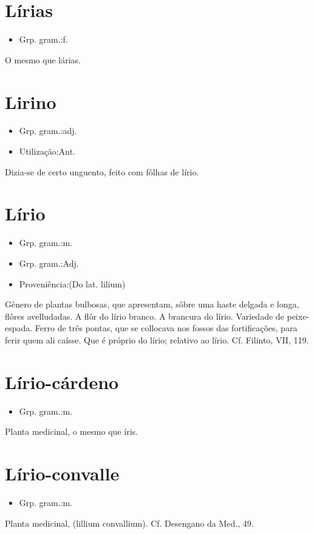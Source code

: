 \section{Lírias}
\begin{itemize}
\item {Grp. gram.:f.}
\end{itemize}
O mesmo que \textunderscore lárias\textunderscore .
\section{Lirino}
\begin{itemize}
\item {Grp. gram.:adj.}
\end{itemize}
\begin{itemize}
\item {Utilização:Ant.}
\end{itemize}
Dizia-se de certo unguento, feito com fôlhas de lírio.
\section{Lírio}
\begin{itemize}
\item {Grp. gram.:m.}
\end{itemize}
\begin{itemize}
\item {Grp. gram.:Adj.}
\end{itemize}
\begin{itemize}
\item {Proveniência:(Do lat. \textunderscore lilium\textunderscore )}
\end{itemize}
Gênero de plantas bulbosas, que apresentam, sôbre uma haste delgada e longa, flôres avelludadas.
A flôr do lírio branco.
A brancura do lírio.
Variedade de peixe-espada.
Ferro de três pontas, que se collocava nos fossos das fortificações, para ferir quem ali caísse.
Que é próprio do lírio; relativo ao lírio. Cf. Filinto, VII, 119.
\section{Lírio-cárdeno}
\begin{itemize}
\item {Grp. gram.:m.}
\end{itemize}
Planta medicinal, o mesmo que \textunderscore íris\textunderscore .
\section{Lírio-convalle}
\begin{itemize}
\item {Grp. gram.:m.}
\end{itemize}
Planta medicinal, (\textunderscore lillium convallium\textunderscore ). Cf. \textunderscore Desengano da Med.\textunderscore , 49.
